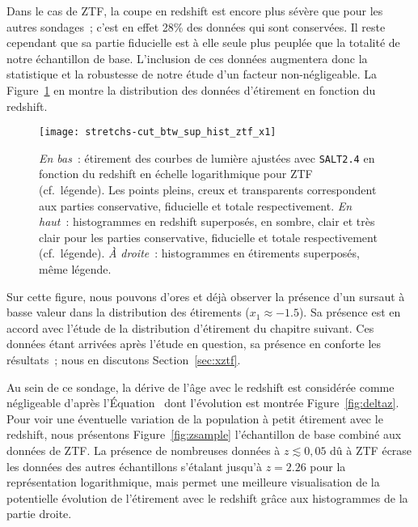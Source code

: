 \documentclass[../main/main.tex]{subfiles}
\begin{document}
Dans le cas de ZTF, la coupe en redshift est encore plus sévère que pour les
autres sondages~; c'est en effet 28\% des données qui sont conservées. Il reste
cependant que sa partie fiducielle est à elle seule plus peuplée que la totalité
de notre échantillon de base. L'inclusion de ces données augmentera donc la
statistique et la robustesse de notre étude d'un facteur non-négligeable. La
Figure~\ref{fig:ztfsample} en montre la distribution des données d'étirement en
fonction du redshift.

\begin{figure}[ht!]
    \centering
    \texttt{[image: stretchs-cut\_btw\_sup\_hist\_ztf\_x1]}
    \caption[Présentation des données d'étirement en fonction du redshift pour
    ZTF]{\textit{En bas}~: étirement des courbes de lumière ajustées avec
        \textsc{\texttt{SALT2.4}} en fonction du redshift en échelle
        logarithmique pour ZTF (cf.~légende). Les points pleins, creux et
        transparents correspondent aux parties conservative, fiducielle et
        totale respectivement. \textit{En haut}~: histogrammes en redshift
        superposés, en sombre, clair et très clair pour les parties
        conservative, fiducielle et totale respectivement (cf.\ légende).
        \textit{À droite}~: histogrammes en étirements superposés, même
    légende.}\label{fig:ztfsample}
\end{figure}

Sur cette figure, nous pouvons d'ores et déjà observer la présence d'un sursaut
à basse valeur dans la distribution des étirements ($x_1 \approx -1.5$). Sa
présence est en accord avec l'étude de la distribution d'étirement du chapitre
suivant. Ces données étant arrivées après l'étude en question, sa présence en
conforte les résultats~; nous en discutons Section~\ref{sec:xztf}.

Au sein de ce sondage, la dérive de l'âge avec le redshift est considérée comme
négligeable d'après l'Équation~ dont l'évolution est montrée
Figure~\ref{fig:deltaz}. Pour voir une éventuelle variation de la population à
petit étirement avec le redshift, nous présentons Figure~\ref{fig:zsample}
l'échantillon de base combiné aux données de ZTF. La présence de nombreuses
données à $z \lesssim 0,05$ dû à ZTF écrase les données des autres échantillons
s'étalant jusqu'à $z = 2.26$ pour la représentation logarithmique, mais permet
une meilleure visualisation de la potentielle évolution de l'étirement avec le
redshift grâce aux histogrammes de la partie droite.
\end{document}

